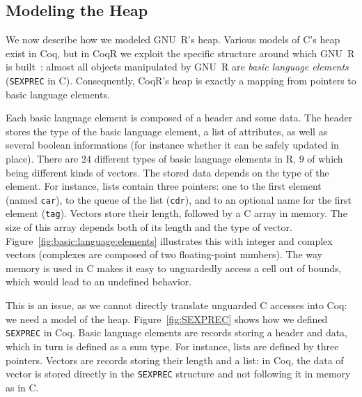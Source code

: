 \documentclass[
    sigplan,
    10pt,
    review, %
    natbib=false %
 ]{acmart}
\newcommand\CoqR{CoqR}
\newcommand\newtext[1]{{\color{blue} #1}}
\begin{document}


\subsection{Modeling the Heap}
\label{sec:heap}

We now describe how we modeled GNU~R's heap.
\newtext{Various models of C's heap~\parencite{formalin,Leroy-Compcert-CACM} exist in Coq, but in \CoqR{} we exploit the specific structure around which GNU~R is built~\parencite{ihaka1996r}:} almost all objects manipulated by GNU~R
are \emph{basic language elements}
(\texttt{SEXPREC} in C).
\newtext{Consequently, CoqR's heap is exactly a mapping from pointers to basic language elements}.


Each basic language element is composed of a header and some data.
%
The header stores the type of the basic language element,
a list of attributes,
as well as several boolean informations
(for instance whether it can be safely updated in place).
There are \(24\) different types of basic language elements in R,
\(9\) of which being different kinds of vectors.
%
The stored data depends on the type of the element.
For instance, lists contain three pointers:
one to the first element (named \texttt{car}),
to the queue of the list (\texttt{cdr}),
and to an optional name for the first element (\texttt{tag}).
Vectors store their length,
followed by a C array in memory.
The size of this array depends both of its length
and the type of vector.
Figure~\ref{fig:basic:language:elements} illustrates this
with integer and complex vectors
(complexes are composed of two floating-point numbers).
%
The way memory is used in C
makes it easy to unguardedly access a cell out of bounds,
which would lead to an undefined behavior.



This is an issue,
as we cannot directly translate unguarded C accesses into Coq:
we need a model of the heap.
Figure~\ref{fig:SEXPREC} shows how we defined \texttt{SEXPREC} in Coq.
Basic language elements are records storing a header
and data,
which in turn is defined as a sum type.
For instance, lists are defined by three pointers.
Vectors are records storing their length and a list:
in Coq, the data of vector is stored directly in the \texttt{SEXPREC} structure
and not following it in memory as in C.
\end{document}
